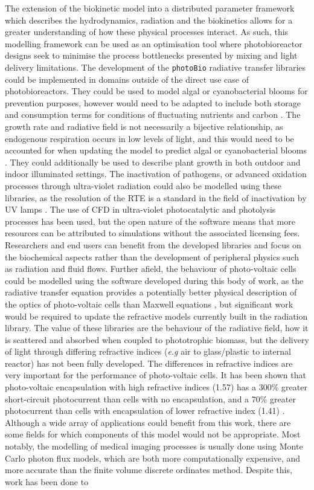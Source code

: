 The extension of the biokinetic model into a distributed parameter framework which describes the hydrodynamics, radiation and the biokinetics allows for a greater understanding of how these physical processes interact. As such, this modelling framework can be used as an optimisation tool where photobioreactor designs seek to minimise the process bottlenecks presented by mixing and light delivery limitations. The development of the \texttt{photoBio} radiative transfer libraries could be implemented in domains outside of the direct use case of photobioreactors. They could be used to model algal or cyanobacterial blooms for prevention purposes, however would need to be adapted to include both storage and consumption terms for conditions of fluctuating nutrients and carbon \cite{wagner2016}. The growth rate and radiative field is not necessarily a bijective relationship, as endogenous respiration occurs in low levels of light, and this would need to be accounted for when updating the model to predict algal or cyanobacterial blooms \cite{shoener2019}. They could additionally be used to describe plant growth in both outdoor and indoor illuminated settings. The inactivation of pathogens, or advanced oxidation processes through ultra-violet radiation could also be modelled using these libraries, as the resolution of the RTE is a standard in the field of inactivation by UV lamps \cite{santoro2017,ulbricht2014}. The use of CFD in ultra-violet photocatalytic and photolysis processes has been used, but the open nature of the software means that more resources can be attributed to simulations without the associated licensing fees. Researchers and end users can benefit from the developed libraries and focus on the biochemical aspects rather than the development of peripheral physics such as radiation and fluid flows. Further afield, the behaviour of photo-voltaic cells could be modelled using the software developed during this body of work, as the radiative transfer equation provides a potentially better physical description of the optics of photo-voltaic cells than Maxwell equations \cite{dahan2013}, but significant work would be required to update the refractive models currently built in the radiation library. The value of these libraries are the behaviour of the radiative field, how it is scattered and absorbed when coupled to phototrophic biomass, but the delivery of light through differing refractive indices (\textit{e.g} air to glass/plastic to internal reactor) has not been fully developed. The differences in refractive indices are very important for the performance of photo-voltaic cells. It has been shown that photo-voltaic encapsulation with high refractive indices (1.57) has a 300\% greater short-circuit photocurrent than cells with no encapsulation, and a 70\% greater photocurrent than cells with encapsulation of lower refractive index (1.41) \cite{ma2010}. Although a wide array of applications could benefit from this work, there are some fields for which components of this model would not be appropriate. Most notably, the modelling of medical imaging processes is usually done using Monte Carlo photon flux models, which are both more computationally expensive, and more accurate than the finite volume discrete ordinates method\cite{kong2014}. Despite this, work has been done to 